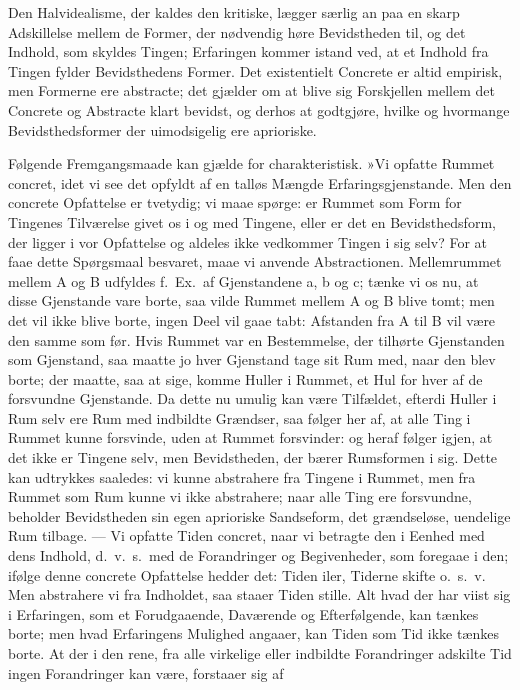 \documentclass[12pt]{book}
\newcommand{\apage}[1]{\marginnote{\footnotesize\textit{[#1]}}}
\begin{document}
Den Halvidealisme, der kaldes den kritiske, lægger særlig an paa en skarp
Adskillelse mellem de Former, der nødvendig høre Bevidstheden til, og det
Indhold, som skyldes Tingen; Erfaringen kommer istand ved, at et Indhold
fra Tingen fylder Bevidsthedens Former. Det existentielt Concrete er altid
empirisk, men Formerne ere abstracte; det gjælder om at blive sig
Forskjellen mellem det Concrete og Abstracte klart bevidst, og derhos at
godtgjøre, hvilke og hvormange Bevidsthedsformer der uimodsigelig ere
aprioriske.

Følgende Fremgangsmaade kan gjælde for charakteristisk. »Vi opfatte
Rummet concret, idet vi see det opfyldt af en talløs Mængde
Erfaringsgjenstande. Men den concrete Opfattelse er tvetydig; vi maae
spørge: er Rummet som Form for Tingenes Tilværelse givet os i og med
Tingene, eller er det en Bevidsthedsform, der ligger i vor Opfattelse og
aldeles ikke vedkommer Tingen i sig selv? For at faae dette Spørgsmaal
besvaret, maae vi anvende Abstractionen. Mellemrummet mellem A og B
udfyldes f.\ Ex.\ af Gjenstandene a, b og c; tænke vi os nu, at disse
Gjenstande vare borte, saa vilde Rummet mellem A og B blive tomt; men det
vil ikke blive borte, ingen Deel vil gaae tabt: Afstanden fra A til B vil
være den samme som før. Hvis Rummet var en Bestemmelse, der tilhørte  \apage{34}
Gjenstanden som Gjenstand, saa maatte jo hver Gjenstand tage sit Rum med,
naar den blev borte; der maatte, saa at sige, komme Huller i Rummet, et
Hul for hver af de forsvundne Gjenstande. Da dette nu umulig kan være
Tilfældet, efterdi Huller i Rum selv ere Rum med indbildte Grændser, saa følger her af, at alle Ting i Rummet kunne forsvinde, uden at Rummet
forsvinder: og heraf følger igjen, at det ikke er Tingene selv, men
Bevidstheden, der bærer Rumsformen i sig. Dette kan udtrykkes saaledes: vi
kunne abstrahere fra Tingene i Rummet, men fra Rummet som Rum kunne vi
ikke abstrahere; naar alle Ting ere forsvundne, beholder Bevidstheden sin
egen aprioriske Sandseform, det grændseløse, uendelige Rum tilbage. --- Vi
opfatte Tiden concret, naar vi betragte den i Eenhed med dens Indhold,
d.\ v.\ s.\ med de Forandringer og Begivenheder, som foregaae i den; ifølge
denne concrete Opfattelse hedder det: Tiden iler, Tiderne skifte o.\ s.\ v.
Men abstrahere vi fra Indholdet, saa staaer Tiden stille. Alt hvad der har
viist sig i Erfaringen, som et Forudgaaende, Daværende og Efterfølgende,
kan tænkes borte; men hvad Erfaringens Mulighed angaaer, kan Tiden som Tid
ikke tænkes borte. At der i den rene, fra alle virkelige eller indbildte
Forandringer adskilte Tid ingen Forandringer kan være, forstaaer sig af
\end{document}
